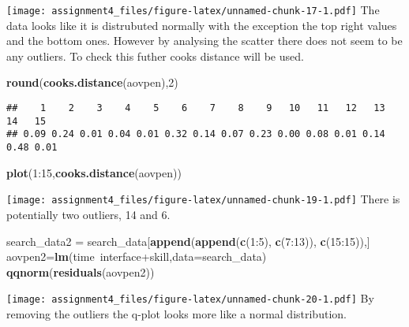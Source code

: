 \documentclass[11pt,]{article}
\newenvironment{Shaded}{\begin{snugshade}}{\end{snugshade}}
\newcommand{\KeywordTok}[1]{\textcolor[rgb]{0.13,0.29,0.53}{\textbf{{#1}}}}
\newcommand{\DataTypeTok}[1]{\textcolor[rgb]{0.13,0.29,0.53}{{#1}}}
\newcommand{\DecValTok}[1]{\textcolor[rgb]{0.00,0.00,0.81}{{#1}}}
\newcommand{\StringTok}[1]{\textcolor[rgb]{0.31,0.60,0.02}{{#1}}}
\newcommand{\NormalTok}[1]{{#1}}
\begin{document}
\texttt{[image: assignment4\_files/figure-latex/unnamed-chunk-17-1.pdf]}
The data looks like it is distrubuted normally with the exception the
top right values and the bottom ones. However by analysing the scatter
there does not seem to be any outliers. To check this futher cooks
distance will be used.

\begin{Shaded}
\begin{Highlighting}[]
\KeywordTok{round}\NormalTok{(}\KeywordTok{cooks.distance}\NormalTok{(aovpen),}\DecValTok{2}\NormalTok{)}
\end{Highlighting}
\end{Shaded}

\begin{verbatim}
##    1    2    3    4    5    6    7    8    9   10   11   12   13   14   15 
## 0.09 0.24 0.01 0.04 0.01 0.32 0.14 0.07 0.23 0.00 0.08 0.01 0.14 0.48 0.01
\end{verbatim}

\begin{Shaded}
\begin{Highlighting}[]
\KeywordTok{plot}\NormalTok{(}\DecValTok{1}\NormalTok{:}\DecValTok{15}\NormalTok{,}\KeywordTok{cooks.distance}\NormalTok{(aovpen))}
\end{Highlighting}
\end{Shaded}

\texttt{[image: assignment4\_files/figure-latex/unnamed-chunk-19-1.pdf]}
There is potentially two outliers, 14 and 6.

\begin{Shaded}
\begin{Highlighting}[]
  \NormalTok{search_data2 =}\StringTok{ }\NormalTok{search_data[}\KeywordTok{append}\NormalTok{(}\KeywordTok{append}\NormalTok{(}\KeywordTok{c}\NormalTok{(}\DecValTok{1}\NormalTok{:}\DecValTok{5}\NormalTok{), }\KeywordTok{c}\NormalTok{(}\DecValTok{7}\NormalTok{:}\DecValTok{13}\NormalTok{)), }\KeywordTok{c}\NormalTok{(}\DecValTok{15}\NormalTok{:}\DecValTok{15}\NormalTok{)),]}
  \NormalTok{aovpen2=}\KeywordTok{lm}\NormalTok{(time~interface+skill,}\DataTypeTok{data=}\NormalTok{search_data)}
  \KeywordTok{qqnorm}\NormalTok{(}\KeywordTok{residuals}\NormalTok{(aovpen2))}
\end{Highlighting}
\end{Shaded}

\texttt{[image: assignment4\_files/figure-latex/unnamed-chunk-20-1.pdf]}
By removing the outliers the q-plot looks more like a normal
distribution.
\end{document}
